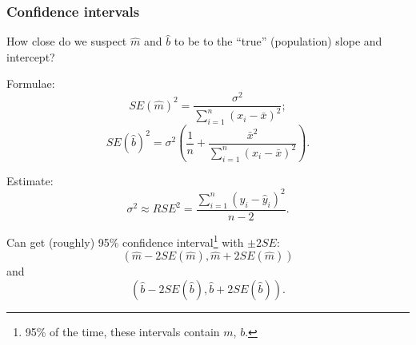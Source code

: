 \documentclass{beamer}
\theoremstyle{example}
\begin{document}
\begin{frame}
    \frametitle{Confidence intervals}
    How close do we suspect $\hat{m}$ and $\hat{b}$ to be to the ``true'' (population) slope and intercept?
    
    Formulae: 
    \[SE(\hat{m})^2 = \frac{\sigma^2}{\sum_{i=1}^n(x_i - \bar{x})^2};\]
    \[SE(\hat{b})^2 = \sigma^2\left(\frac1{n} + \frac{\bar{x}^2}{\sum_{i=1}^n(x_i - \bar{x})^2}\right).\]
    
    Estimate:
        \[\sigma^2 \approx RSE^2 = \frac{\sum_{i=1}^n(y_i - \hat{y}_i)^2}{n-2}.\]
    
        \pause
    Can get (roughly) 95\% confidence interval\footnote{95\% of the time, these intervals contain $m$, $b$.} with $\pm 2SE$: 
        \[(\hat{m} - 2SE(\hat{m}), \hat{m} + 2SE(\hat{m}))\]
    and 
        \[(\hat{b} - 2SE(\hat{b}), \hat{b} + 2SE(\hat{b})).\]
    
\end{frame}
\end{document}
